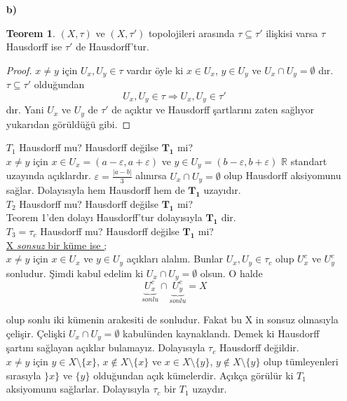 \documentclass[10pt,a4paper]{article}
\theoremstyle{definition} \newtheorem{teo}{Teorem}
\begin{document}
\begin{enumerate}
\begin{enumerate}
\item[\textbf{b)}]\begin{teo}
$(X,\tau)$ ve $(X, \tau ')$ topolojileri arasında $\tau \subseteq \tau '$ ilişkisi varsa $\tau$ Hausdorff ise $\tau '$ de Hausdorff'tur.
\end{teo}

\begin{proof}
$x\neq y$ için $U_{x}, U_{y}\in \tau$ vardır öyle ki $x\in U_{x}$, $y\in U_{y}$ ve $U_{x}\cap U_{y}=\emptyset$ dır.$\tau \subseteq \tau '$ olduğundan
\begin{displaymath}
U_{x}, U_{y}\in \tau \Rightarrow U_{x}, U_{y}\in \tau '
\end{displaymath}
dır. Yani $U_{x}$ ve $U_{y}$ de $\tau '$ de açıktır ve Hausdorff şartlarını zaten sağlıyor yukarıdan görüldüğü gibi.
\end{proof}
$T_{1}$ Hausdorff mu? Hausdorff değilse $\mathbf{T_{1}}$ mi?\\
$x\neq y$ için $x\in U_{x}=(a-\varepsilon, a+\varepsilon )$ ve $y\in U_{y}=(b-\varepsilon, b+\varepsilon)$ $\mathbb{R}$ standart uzayında açıklardır. $\varepsilon = \frac{|a-b|}{3}$ alınırsa $U_{x}\cap U_{y}=\emptyset$ olup Hausdorff aksiyomunu sağlar. Dolayısıyla hem Hausdorff hem de $\mathbf{T_{1}}$ uzayıdır.\\

$T_{2}$ Hausdorff mu? Hausdorff değilse $\mathbf{T_{1}}$ mi?\\
Teorem 1'den dolayı Hausdorff'tur dolayısıyla $\mathbf{T_{1}}$ dir.\\

$T_{3}=\tau_{c}$ Hausdorff mu? Hausdorff değilse $\mathbf{T_{1}}$ mi?\\
\underline{X \textit{sonsuz} bir küme ise ;}
\\$x\neq y$ için $x\in U_{x}$ ve $y\in U_{y}$ açıkları alalım. Bunlar $U_{x}, U_{y}\in \tau_{c}$ olup $U_{x}^{c}$ ve $U_{y}^{c}$ sonludur. Şimdi kabul edelim ki $U_{x}\cap U_{y}=\emptyset$ olsun. O halde
\begin{displaymath}
\underbrace{U_{x}^{c}}_{sonlu} \cap \underbrace{U_{y}^{c}}_{sonlu}=X
\end{displaymath}

olup sonlu iki kümenin arakesiti de sonludur. Fakat bu X in sonsuz olmasıyla çelişir. Çelişki $U_{x}\cap U_{y}=\emptyset$ kabulünden kaynaklandı. Demek ki Hausdorff şartını sağlayan açıklar bulamayız. Dolayısıyla  $\tau_{c}$ Hausdorff değildir.\\

$x\neq y$ için $y\in X\setminus \{x\}$, $ x\notin X\setminus \{x\} $ ve $x\in X\setminus \{y\}$, $ y\notin X\setminus \{y\} $ olup tümleyenleri sırasıyla $\}x\}$ ve $\{y\}$ olduğundan açık kümelerdir. Açıkça görülür ki $T_{1}$ aksiyomunu sağlarlar. Dolayısıyla  $\tau_{c}$ bir $T_{1}$ uzaydır.\\


\end{enumerate}
\end{enumerate}
\end{document}
